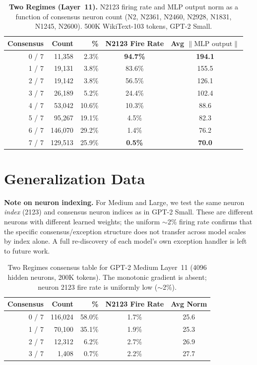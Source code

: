 \documentclass{article}
\begin{document}
\begin{table}[h]
\caption{\textbf{Two Regimes (Layer~11).} N2123 firing rate and MLP output norm as a function of
  consensus neuron count (N2, N2361, N2460, N2928, N1831, N1245, N2600).
  500K WikiText-103 tokens, GPT-2 Small.}
\label{tab:tworegimes}
\centering
\begin{tabular}{rrrcc}
\toprule
Consensus & Count & \% & N2123 Fire Rate & Avg $\|\text{MLP output}\|$ \\
\midrule
0 / 7 & 11,358  & 2.3\%  & \textbf{94.7\%} & \textbf{194.1} \\
1 / 7 & 19,131  & 3.8\%  & 83.6\%          & 155.5 \\
2 / 7 & 19,142  & 3.8\%  & 56.5\%          & 126.1 \\
3 / 7 & 26,189  & 5.2\%  & 24.4\%          & 102.4 \\
4 / 7 & 53,042  & 10.6\% & 10.3\%          & 88.6 \\
5 / 7 & 95,267  & 19.1\% & 4.5\%           & 82.3 \\
6 / 7 & 146,070 & 29.2\% & 1.4\%           & 76.2 \\
7 / 7 & 129,513 & 25.9\% & \textbf{0.5\%}  & \textbf{70.0} \\
\bottomrule
\end{tabular}
\end{table}

\section{Generalization Data}
\label{app:generalization}

\textbf{Note on neuron indexing.} For Medium and Large, we test the same neuron \emph{index}
(2123) and consensus neuron indices as in GPT-2 Small. These are different neurons with
different learned weights; the uniform $\sim$2\% firing rate confirms that the specific
consensus/exception structure does not transfer across model scales by index alone.
A full re-discovery of each model's own exception handler is left to future work.

\begin{table}[h]
\caption{Two Regimes consensus table for GPT-2 Medium Layer~11 (4096 hidden neurons, 200K tokens).
  The monotonic gradient is absent; neuron 2123 fire rate is uniformly low ($\sim$2\%).}
\label{tab:medium}
\centering
\begin{tabular}{rrrcc}
\toprule
Consensus & Count & \% & N2123 Fire Rate & Avg Norm \\
\midrule
0 / 7 & 116,024 & 58.0\% & 1.7\% & 25.6 \\
1 / 7 & 70,100  & 35.1\% & 1.9\% & 25.3 \\
2 / 7 & 12,312  & 6.2\%  & 2.7\% & 26.9 \\
3 / 7 & 1,408   & 0.7\%  & 2.2\% & 27.7 \\
\bottomrule
\end{tabular}
\end{table}
\end{document}
